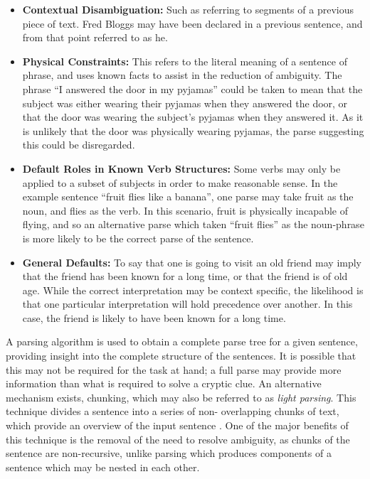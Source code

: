 \begin{itemize}
	\item \textbf{Contextual Disambiguation:} Such as referring to segments of
	a previous piece of text. Fred Bloggs may have been declared in a previous
	sentence, and from that point referred to as he.
	\item \textbf{Physical Constraints:} This refers to the literal meaning of
	a sentence of phrase, and uses known facts to assist in the reduction of
	ambiguity. The phrase “I answered the door in my pyjamas” could be taken to
	mean that the subject was either wearing their pyjamas when they answered
	the door, or that the door was wearing the subject’s pyjamas when they
	answered it. As it is unlikely that the door was physically wearing
	pyjamas, the parse suggesting this could be disregarded.
	\item \textbf{Default Roles in Known Verb Structures:} Some verbs may only
	be applied to a subset of subjects in order to make reasonable sense. In
	the example sentence “fruit flies like a banana”, one parse may take fruit
	as the noun, and flies as the verb. In this scenario, fruit	is physically
	incapable of flying, and so an alternative parse which taken “fruit flies”
	as the noun-phrase is more likely to be the correct parse of the sentence.
	\item \textbf{General Defaults:} To say that one is going to visit an old
	friend may imply that the friend has been known for a long time, or that
	the friend is of old age. While the correct interpretation may be context
	specific, the likelihood is that one particular interpretation will hold
	precedence over another. In this case, the friend is likely to have been
	known for a long time.
\end{itemize}

\begin{flushright}
	\citep{mccluskey99}
\end{flushright}

A parsing algorithm is used to obtain a complete parse tree for a given
sentence, providing insight into the complete structure of the sentences. It is
possible that this may not be required for the task at hand; a full parse may
provide more information than what is required to solve a cryptic clue. An
alternative mechanism exists, chunking, which may also be referred to as
\emph{light parsing}. This technique divides a sentence into a series of non-
overlapping chunks of text, which provide an overview of the input sentence
\citep{litman03}. One of the major benefits of this technique is the removal of
the need to resolve ambiguity, as chunks of the sentence are non-recursive,
unlike parsing which produces components of a sentence which may be nested in
each other.

